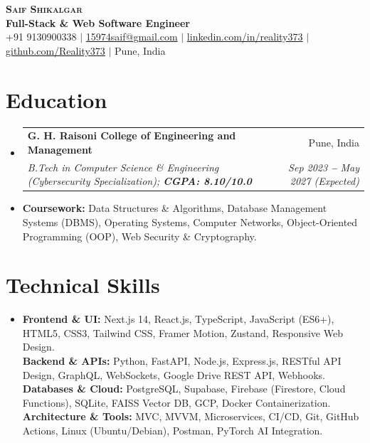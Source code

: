 \documentclass[letterpaper,9pt]{extarticle}
\makeatletter
\newcommand{\resumeSubheading}[4]{
  \vspace{-2pt}\item
    \begin{tabular*}{\linewidth}[t]{l@{\extracolsep{\fill}}r}
      \textbf{#1} & #2 \\
      \textit{\small#3} & \textit{\small #4} \\
    \end{tabular*}\vspace{-5pt}
}
\newcommand{\resumeSubHeadingListStart}{\begin{itemize}[leftmargin=0.08in, label={}]}
\newcommand{\resumeSubHeadingListEnd}{\end{itemize}\vspace{-5pt}}
\makeatother
\begin{document}
\begin{center}
    \textbf{\LARGE \scshape Saif Shikalgar} \\ \vspace{2pt}
    \small
    \textbf{Full-Stack \& Web Software Engineer} \\ \vspace{1.5pt}
    +91 9130900338
    $|$
    \href{mailto:15974saif@gmail.com}{15974saif@gmail.com}
    $|$
    \href{https://www.linkedin.com/in/reality373}{linkedin.com/in/reality373}
    $|$
    \href{https://github.com/Reality373}{github.com/Reality373}
    $|$
    Pune, India
\end{center}
\vspace{-6pt}

\section{Education}
  \vspace{1pt}
  \resumeSubHeadingListStart
    \resumeSubheading
      {G. H. Raisoni College of Engineering and Management}{Pune, India}
      {B.Tech in Computer Science \& Engineering (Cybersecurity Specialization); \textbf{CGPA: 8.10/10.0}}{Sep 2023 \textbf{--} May 2027 (Expected)}
      \vspace{-2pt}
      \item{
        \small{\textbf{Coursework:} Data Structures \& Algorithms, Database Management Systems (DBMS), Operating Systems, Computer Networks, Object-Oriented Programming (OOP), Web Security \& Cryptography.}
      }
  \resumeSubHeadingListEnd

\section{Technical Skills}
  \vspace{1pt}
  \resumeSubHeadingListStart
    \item{
        \small{\textbf{Frontend \& UI:}{ Next.js 14, React.js, TypeScript, JavaScript (ES6+), HTML5, CSS3, Tailwind CSS, Framer Motion, Zustand, Responsive Web Design.}} \\ \vspace{1.5pt}
        \small{\textbf{Backend \& APIs:}{ Python, FastAPI, Node.js, Express.js, RESTful API Design, GraphQL, WebSockets, Google Drive REST API, Webhooks.}} \\ \vspace{1.5pt}
        \small{\textbf{Databases \& Cloud:}{ PostgreSQL, Supabase, Firebase (Firestore, Cloud Functions), SQLite, FAISS Vector DB, GCP, Docker Containerization.}} \\ \vspace{1.5pt}
        \small{\textbf{Architecture \& Tools:}{ MVC, MVVM, Microservices, CI/CD, Git, GitHub Actions, Linux (Ubuntu/Debian), Postman, PyTorch AI Integration.}}
    }
  \resumeSubHeadingListEnd
\end{document}
